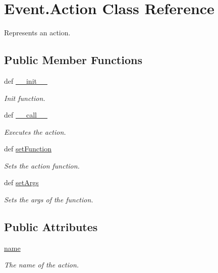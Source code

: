 \hypertarget{class_event_1_1_action}{
\section{Event.Action Class Reference}
\label{class_event_1_1_action}
}


Represents an action.  


\subsection*{Public Member Functions}
\begin{DoxyCompactItemize}
\item 
def \hyperlink{class_event_1_1_action_a678dc7fe4d31e1bea00901932a257a25}{\_\-\_\-init\_\-\_\-}
\begin{DoxyCompactList}\small\item\em Init function. \item\end{DoxyCompactList}\item 
def \hyperlink{class_event_1_1_action_a40e99c8994e9b5ac2864867b5d88689a}{\_\-\_\-call\_\-\_\-}
\begin{DoxyCompactList}\small\item\em Executes the action. \item\end{DoxyCompactList}\item 
def \hyperlink{class_event_1_1_action_ac7f7a93404df4a368875775dda754a2d}{setFunction}
\begin{DoxyCompactList}\small\item\em Sets the action function. \item\end{DoxyCompactList}\item 
def \hyperlink{class_event_1_1_action_aa2e64536b90d2655d215f2ede931a672}{setArgs}
\begin{DoxyCompactList}\small\item\em Sets the args of the function. \item\end{DoxyCompactList}\end{DoxyCompactItemize}
\subsection*{Public Attributes}
\begin{DoxyCompactItemize}
\item 
\hyperlink{class_event_1_1_action_a01e4cadf34243e09c4b67b9392fef22a}{name}
\begin{DoxyCompactList}\small\item\em The name of the action. \item\end{DoxyCompactList}\end{DoxyCompactItemize}

